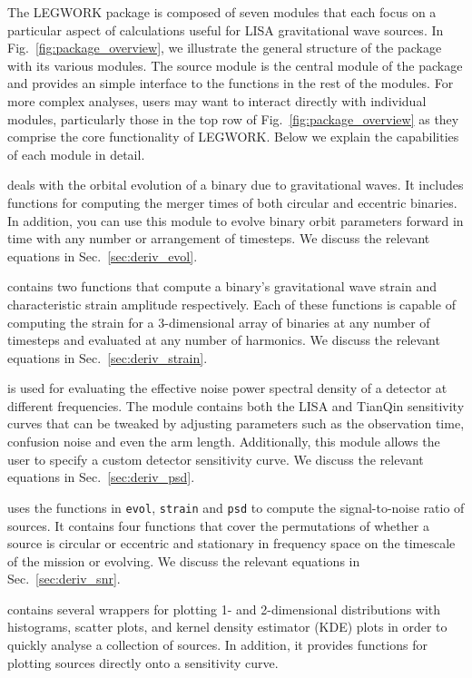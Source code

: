 \documentclass[twocolumn]{aastex63}
\newcommand{\lw}{LEGWORK}
\newcommand{\lwColour}{SeaGreen}
\newcommand{\lwModLink}[1]{\href{https://legwork.readthedocs.io/en/latest/modules.html\#module-legwork.#1}{\color{\lwColour}{\texttt{#1}}}}
\begin{document}
The \lw{} package is composed of seven modules that each focus on a particular aspect of calculations useful for LISA gravitational wave sources. In Fig.~\ref{fig:package_overview}, we illustrate the general structure of the package with its various modules. The source module is the central module of the package and provides an simple interface to the functions in the rest of the modules. For more complex analyses, users may want to interact directly with individual modules, particularly those in the top row of Fig.~\ref{fig:package_overview} as they comprise the core functionality of \lw{}. Below we explain the capabilities of each module in detail.

\lwModLink{evol} deals with the orbital evolution of a binary due to gravitational waves. It includes functions for computing the merger times of both circular and eccentric binaries. In addition, you can use this module to evolve binary orbit parameters forward in time with any number or arrangement of timesteps. We discuss the relevant equations in Sec.~\ref{sec:deriv_evol}.

\lwModLink{strain} contains two functions that compute a binary's gravitational wave strain and characteristic strain amplitude respectively. Each of these functions is capable of computing the strain for a 3-dimensional array of binaries at any number of timesteps and evaluated at any number of harmonics. We discuss the relevant equations in Sec.~\ref{sec:deriv_strain}.

\lwModLink{psd} is used for evaluating the effective noise power spectral density of a detector at different frequencies. The module contains both the LISA and TianQin sensitivity curves that can be tweaked by adjusting parameters such as the observation time, confusion noise and even the arm length. Additionally, this module allows the user to specify a custom detector sensitivity curve. We discuss the relevant equations in Sec.~\ref{sec:deriv_psd}.

\lwModLink{snr} uses the functions in \texttt{evol}, \texttt{strain} and \texttt{psd} to compute the signal-to-noise ratio of sources. It contains four functions that cover the permutations of whether a source is circular or eccentric and stationary in frequency space on the timescale of the mission or evolving. We discuss the relevant equations in Sec.~\ref{sec:deriv_snr}.

\lwModLink{visualisation} contains several wrappers for plotting 1- and 2-dimensional distributions with histograms, scatter plots, and kernel density estimator (KDE) plots in order to quickly analyse a collection of sources. In addition, it provides functions for plotting sources directly onto a sensitivity curve.
\end{document}
